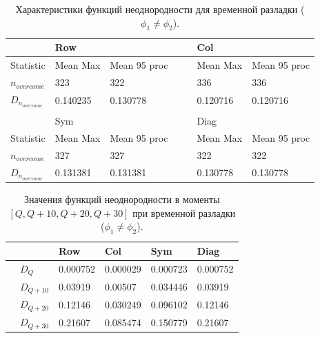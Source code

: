 \documentclass[specialist, substylefile = spbu.rtx,
			   subf, href, 12pt]{disser}
\begin{document}
\newpage

\begin{table}[!hhh]
	\center
	\caption{Характеристики функций неоднородности для временной разладки ($\phi_1 \neq \phi_2$).}
	\begin{tabular}{l|lll|lll}
		 				   & Row		  	  & 			 &&  & Col 		      & 			      \\
		\hline
		 Statistic        & Mean Max 	  & Mean 95 proc && 	& Mean Max     & Mean 95 proc     \\
		 $n_{overcome}$   & 323   	  & 322      &&     & 336       & 336 		  \\
		$D_{n_{overcome}}$& 0.140235		  &	0.130778	 &&     & 0.120716		  &   0.120716             \\
		&&&&&& \\
		  				   & Sym 		  	  & 			 && & 	Diag	      & 			      \\
		  				   \hline
		 Statistic        & Mean Max 	  & Mean 95 proc && 	& Mean Max     & Mean 95 proc     \\
		 $n_{overcome}$   & 327   	  & 327      &&     & 322      & 322		  \\
		$D_{n_{overcome}}$& 0.131381		  &	0.131381		 &&     & 0.130778		 & 0.130778             \\
	\end{tabular}
	\label{tab:TemporaryHeterogeneityShifted}
\end{table}


\begin{table}[!hhh]
	\center
	\caption{Значения функций неоднородности в моменты $ [Q, Q+10, Q+20, Q+30] $ при временной разладки ($\phi_1 \neq \phi_2$). }
	\begin{tabular}{ll|llll}
		&              & Row 	  & Col 	& Sym    & Diag  \\
		\hline
		& $D_Q$        & 0.000752	  & 0.000029 	& 0.000723 & 0.000752		\\
		& $D_{Q+10}$   & 0.03919   & 0.00507  & 0.034446 & 0.03919	\\
		& $D_{Q+20}$   & 0.12146   & 0.030249  & 0.096102 & 0.12146	\\
		& $D_{Q+30}$   & 0.21607	  &	0.085474	& 0.150779 & 0.21607	
	\end{tabular}
	\label{tab:TemporaryHeterogeneityShiftedValues}
\end{table}
\end{document}
